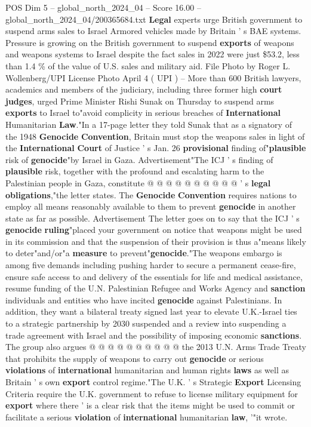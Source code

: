 \begin{textsample}{POS Dim 5 – global\_north\_2024\_04 – Score 16.00 – global\_north\_2024\_04/200365684.txt}  \label{ex:f5_pos_269}
\textbf{Legal} experts urge British government to suspend arms sales to Israel Armored vehicles made by Britain ' s BAE systems.
Pressure is growing on the British government to suspend \textbf{exports} of weapons and weapons systems to Israel despite the fact sales in 2022 were just \$53.2, less than 1.4 \% of the value of U.S. sales and military aid.
File Photo by Roger L.
Wollenberg/UPI License Photo April 4 ( UPI ) -- More than 600 British lawyers, academics and members of the judiciary, including three former high \textbf{court} \textbf{judges}, urged Prime Minister Rishi Sunak on Thursday to suspend arms \textbf{exports} to Israel to"avoid complicity in serious breaches of \textbf{International} Humanitarian \textbf{Law}."In a 17-page letter they told Sunak that as a signatory of the 1948 \textbf{Genocide} \textbf{Convention}, Britain must stop the weapons sales in light of the \textbf{International} \textbf{Court} of Justice ' s Jan. 26 \textbf{provisional} finding of"\textbf{plausible} risk of \textbf{genocide}"by Israel in Gaza.
Advertisement"The ICJ ' s finding of \textbf{plausible} risk, together with the profound and escalating harm to the Palestinian people in Gaza, constitute @ @ @ @ @ @ @ @ @ @ ' s \textbf{legal} \textbf{obligations},"the letter states.
The \textbf{Genocide} \textbf{Convention} requires nations to employ all means reasonably available to them to prevent \textbf{genocide} in another state as far as possible.
Advertisement The letter goes on to say that the ICJ ' s \textbf{genocide} \textbf{ruling}"placed your government on notice that weapons might be used in its commission and that the suspension of their provision is thus a"means likely to deter"and/or"a \textbf{measure} to prevent"\textbf{genocide}."The weapons embargo is among five demands including pushing harder to secure a permanent cease-fire, ensure safe access to and delivery of the essentials for life and medical assistance, resume funding of the U.N.
Palestinian Refugee and Works Agency and \textbf{sanction} individuals and entities who have incited \textbf{genocide} against Palestinians.
In addition, they want a bilateral treaty signed last year to elevate U.K.-Israel ties to a strategic partnership by 2030 suspended and a review into suspending a trade agreement with Israel and the possibility of imposing economic \textbf{sanctions}.
The group also argues @ @ @ @ @ @ @ @ @ @ the 2013 U.N.
Arms Trade Treaty that prohibits the supply of weapons to carry out \textbf{genocide} or serious \textbf{violations} of \textbf{international} humanitarian and human rights \textbf{laws} as well as Britain ' s own \textbf{export} control regime."The U.K. ' s Strategic \textbf{Export} Licensing Criteria require the U.K. government to refuse to license military equipment for \textbf{export} where there ' is a clear risk that the items might be used to commit or facilitate a serious \textbf{violation} of \textbf{international} humanitarian \textbf{law}, '"it wrote.

\end{textsample}
